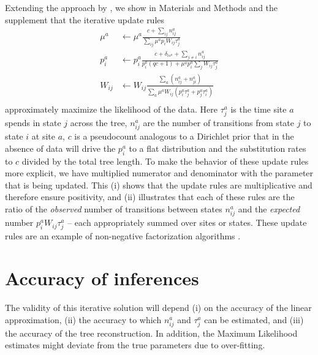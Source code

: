 \documentclass[aps,rmp,twocolumn,linenumbers]{revtex4-1}
\newcommand{\eqp}{p}
\newcommand{\pc}{c}
\begin{document}
Extending the approach by \citet{bruno1996modeling}, we show in Materials and Methods and the supplement that the iterative update rules
\begin{equation}
\label{eq:update}
	\begin{split}
		\mu^a & \leftarrow \mu^a\frac{\pc+\sum_{ij} n^a_{ij}}{\sum_{ij}\mu^a \eqp_{i}W_{ij}\tau_j^a} \\
		\eqp^a_i & \leftarrow \eqp^a_i\frac{\pc+\delta_{is^{a}} + \sum_{j\neq i} n^a_{ij}}{\eqp^a_i(q\pc+1) + \mu^a\eqp^a_i \sum_{j}W_{ij}\tau_j^a} \\
		W_{ij} & \leftarrow W_{ij}\frac{\sum_a (n^a_{ij}+n^a_{ji})}{\sum_a \mu^a W_{ij}(\eqp_i^a\tau_j^a + \eqp_j^a \tau_i^a)} \\
	\end{split}
\end{equation}
approximately maximize the likelihood of the data.
Here $\tau^a_j$ is the time site $a$ spends in state $j$ across the tree, $n^a_{ij}$ are the number of transitions from state $j$ to state $i$ at site $a$,
$\pc$ is a pseudocount analogous to a Dirichlet prior that in the absence of data will drive the $\eqp_i^a$ to a flat distribution and the substitution rates to $\pc$ divided by the total tree length.
To make the behavior of these update rules more explicit, we have multiplied numerator and denominator with the parameter that is being updated.
This (i) shows that the update rules are multiplicative and therefore ensure positivity, and (ii) illustrates that each of these rules are the ratio of the {\it observed} number of transitions between states $n^a_{ij}$ and the {\it expected} number $\eqp^a_i W_{ij}\tau_j^a$ -- each appropriately summed over sites or states.
These update rules are an example of non-negative factorization algorithms \citep{lee_algorithms_2001}.

\section*{Accuracy of inferences}
The validity of this iterative solution will depend (i) on the accuracy of the linear approximation, (ii) the accuracy to which $n_{ij}^a$ and $\tau_{j}^a$ can be estimated, and (iii) the accuracy of the tree reconstruction.
In addition, the Maximum Likelihood estimates might deviate from the true parameters due to over-fitting.
\end{document}
